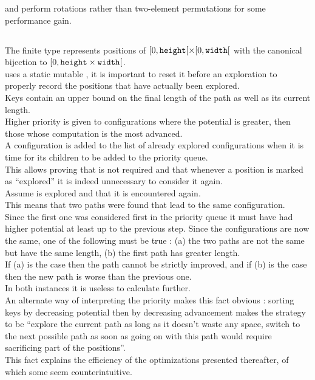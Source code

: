  and  perform rotations rather than two-element permutations
for some performance gain.\\


\subsection{}

The finite type represents positions of \([0,\texttt{height}[ \times [0,\texttt{width}[\)
with the canonical bijection to \([0, \texttt{height}\times\texttt{width}[\).\\

 uses a static mutable , it is important to reset it before
an exploration to properly record the positions that have actually been explored.\\

Keys contain an upper bound on the final length of the path as well as its
current length.\\
Higher priority is given to configurations where the potential is greater, then
those whose computation is the most advanced.\\

A configuration  is added to the list
of already explored configurations when it is time for its children to be added
to the priority queue.\\
This allows proving that  is not required and that whenever a
position is marked as ``explored'' it is indeed unnecessary to consider it again.\\

Assume  is explored and that it is encountered again.\\
This means that two paths were found that lead to the same configuration.\\
Since the first one was considered first in the priority queue it must have
had higher potential at least up to the previous step. Since the configurations
are now the same, one of the following must be true :
(a) the two paths are not the same but have the same length,
(b) the first path has greater length.\\
If (a) is the case then the path cannot be strictly improved, and if (b) is the case
then the new path is worse than the previous one.\\
In both instances it is useless to calculate further.\\

An alternate way of interpreting the priority makes this fact obvious : sorting
keys by decreasing potential then by decreasing advancement makes the strategy to
be ``explore the current path as long as it doesn't waste any space, switch
to the next possible path as soon as going on with this path would require
sacrificing part of the positions''.\\
This fact explains the efficiency of the optimizations presented thereafter, of
which some seem counterintuitive.\\


